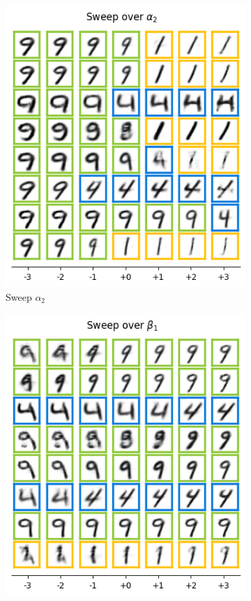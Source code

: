 \begin{figure}[h]
\begin{subfigure}[t]{.23\linewidth}
        \includegraphics[width=.9\textwidth]{openreview/pictures/Figure13/alpha_2.png}
        \caption{Sweep $\alpha_2$}
    \end{subfigure}
    \begin{subfigure}[t]{.23\linewidth}
        \includegraphics[width=.9\textwidth]{openreview/pictures/Figure13/beta_1.png}

\end{subfigure}
\end{figure}
